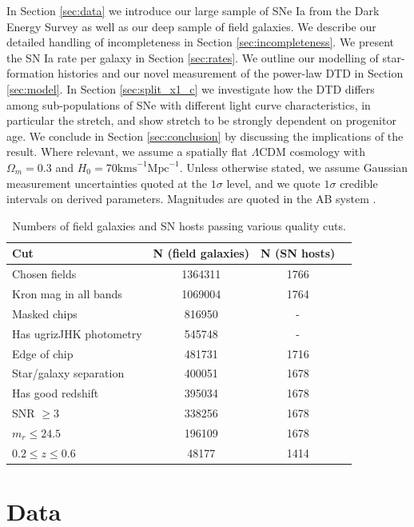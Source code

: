 \documentclass[fleqn,usenatbib]{mnras}
\begin{document}
In Section \ref{sec:data} we introduce our large sample of SNe Ia from the Dark Energy Survey as well as our deep sample of field galaxies. We describe our detailed handling of incompleteness in Section \ref{sec:incompleteness}. We present the SN Ia rate per galaxy in Section \ref{sec:rates}. We outline our modelling of star-formation histories and our novel measurement of the power-law DTD in Section \ref{sec:model}. In Section \ref{sec:split_x1_c} we investigate how the DTD differs among sub-populations of SNe with different light curve characteristics, in particular the stretch, and show stretch to be strongly dependent on progenitor age. We conclude in Section \ref{sec:conclusion} by discussing the implications of the result.
Where relevant, we assume a spatially flat $\Lambda$CDM cosmology with $\Omega_m = 0.3$ and $H_0 = 70 \mathrm{ km s}^{-1}\mathrm{Mpc}^{-1}$. Unless otherwise stated, we assume Gaussian measurement uncertainties quoted at the $1\sigma$ level, and we quote $1\sigma$ credible intervals on derived parameters. Magnitudes are quoted in the AB system \citep{Oke1983}.


\begin{table}
	\centering
	\caption{Numbers of field galaxies and SN hosts passing various quality cuts.}
	\label{tab:cuts}
	\begin{tabular}{lccr} %
		\hline
		Cut & N (field galaxies)  & N (SN hosts)\\
		\hline
		Chosen fields & 1364311  & 1766\\
	    Kron mag in all bands & 1069004  & 1764 \\
	    Masked chips & 816950  & - \\
	    Has ugrizJHK photometry & 545748  & -\\
	    Edge of chip & 481731 & 1716 \\
	    Star/galaxy separation & 400051 &  1678\\
	    Has good redshift & 395034 & 1678 \\
	    SNR $\geq 3$& 338256  & 1678 \\
	    $m_r \leq 24.5$ & 196109 &  1678 \\
	    $0.2 \leq z \leq 0.6$ & 48177 & 1414\\ 
	    
		\hline
	\end{tabular}
\end{table}

\section{Data}
\end{document}

